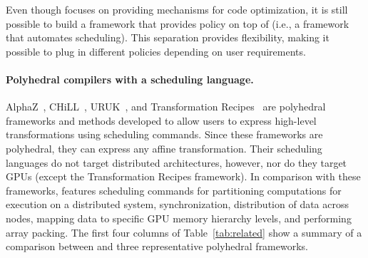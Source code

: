 Even though \framework{} focuses on providing mechanisms for code optimization, it is still possible to build a framework that provides policy on top of \framework{} (i.e., a framework that automates scheduling).  This separation provides flexibility, making it possible to plug in different policies depending on user requirements.  %

\paragraph{Polyhedral compilers with a scheduling language.}
AlphaZ~\cite{yuki2012alphaz}, CHiLL~\cite{chill,Hall2010}, URUK~\cite{Girbal2006}, and Transformation Recipes~\cite{Hall:2009:LTR:2155247.2155251} are polyhedral frameworks and methods developed to allow users to express high-level transformations using scheduling commands. 
Since these frameworks are polyhedral, they can express any affine transformation.
Their scheduling languages do not target distributed architectures, however, nor do they target GPUs (except the Transformation Recipes framework).  In comparison with these frameworks, \framework features scheduling commands for partitioning computations for execution on a distributed system, synchronization, distribution of data across nodes, mapping data to specific GPU memory hierarchy levels, and performing array packing.  The first four columns of Table~\ref{tab:related} show a summary of a comparison between \framework{} and three representative polyhedral frameworks.

